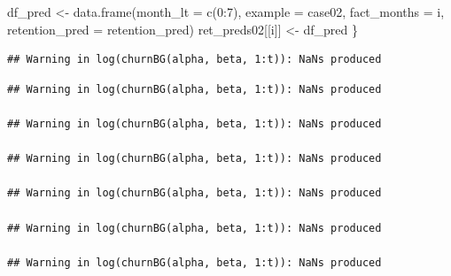 \documentclass[
]{book}
\newenvironment{Shaded}{\begin{snugshade}}{\end{snugshade}}
\newcommand{\AttributeTok}[1]{\textcolor[rgb]{0.77,0.63,0.00}{#1}}
\newcommand{\DecValTok}[1]{\textcolor[rgb]{0.00,0.00,0.81}{#1}}
\newcommand{\FunctionTok}[1]{\textcolor[rgb]{0.00,0.00,0.00}{#1}}
\newcommand{\NormalTok}[1]{#1}
\newcommand{\OtherTok}[1]{\textcolor[rgb]{0.56,0.35,0.01}{#1}}
\newcommand{\SpecialCharTok}[1]{\textcolor[rgb]{0.00,0.00,0.00}{#1}}
\newcommand{\StringTok}[1]{\textcolor[rgb]{0.31,0.60,0.02}{#1}}
\begin{document}
\begin{Shaded}
\begin{Highlighting}[]
\NormalTok{        df\_pred }\OtherTok{\textless{}{-}} \FunctionTok{data.frame}\NormalTok{(}\AttributeTok{month\_lt =} \FunctionTok{c}\NormalTok{(}\DecValTok{0}\SpecialCharTok{:}\DecValTok{7}\NormalTok{),}
                              \AttributeTok{example =} \StringTok{\textquotesingle{}case02\textquotesingle{}}\NormalTok{,}
                              \AttributeTok{fact\_months =}\NormalTok{ i,}
                              \AttributeTok{retention\_pred =}\NormalTok{ retention\_pred)}
\NormalTok{        ret\_preds02[[i]] }\OtherTok{\textless{}{-}}\NormalTok{ df\_pred}
\NormalTok{\}}
\end{Highlighting}
\end{Shaded}

\begin{verbatim}
## Warning in log(churnBG(alpha, beta, 1:t)): NaNs produced
\end{verbatim}

\begin{verbatim}
## Warning in log(churnBG(alpha, beta, 1:t)): NaNs produced

## Warning in log(churnBG(alpha, beta, 1:t)): NaNs produced

## Warning in log(churnBG(alpha, beta, 1:t)): NaNs produced

## Warning in log(churnBG(alpha, beta, 1:t)): NaNs produced

## Warning in log(churnBG(alpha, beta, 1:t)): NaNs produced

## Warning in log(churnBG(alpha, beta, 1:t)): NaNs produced
\end{verbatim}
\end{document}
